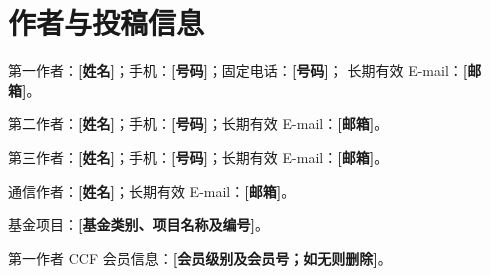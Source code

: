 \section*{作者与投稿信息}

第一作者：\textbf{[姓名]}；手机：\textbf{[号码]}；固定电话：\textbf{[号码]}；
长期有效 E-mail：\textbf{[邮箱]}。

第二作者：\textbf{[姓名]}；手机：\textbf{[号码]}；长期有效 E-mail：\textbf{[邮箱]}。

第三作者：\textbf{[姓名]}；手机：\textbf{[号码]}；长期有效 E-mail：\textbf{[邮箱]}。

通信作者：\textbf{[姓名]}；长期有效 E-mail：\textbf{[邮箱]}。

基金项目：\textbf{[基金类别、项目名称及编号]}。

第一作者 CCF 会员信息：\textbf{[会员级别及会员号；如无则删除]}。
